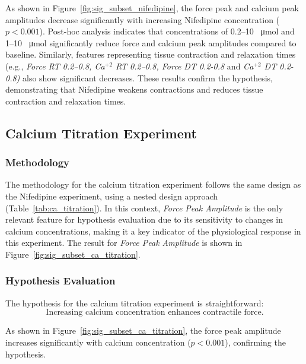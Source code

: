 \documentclass{report}
\begin{document}
            
            As shown in Figure~\ref{fig:sig_subset_nifedipine}, the force peak and calcium peak amplitudes decrease significantly with increasing Nifedipine concentration (\(p < 0.001\)). Post-hoc analysis indicates that concentrations of 0.2–10 \SI{}{\umol} and 1–10 \SI{}{\umol} significantly reduce force and calcium peak amplitudes compared to baseline. Similarly, features representing tissue contraction and relaxation times (e.g., \textit{Force RT 0.2–0.8, Ca$^{+2}$ RT 0.2–0.8, Force DT 0.2-0.8} and \textit{Ca$^{+2}$ DT 0.2-0.8)} also show significant decreases. These results confirm the hypothesis, demonstrating that Nifedipine weakens contractions and reduces tissue contraction and relaxation times.
            
        
   \subsection{Calcium Titration Experiment}
    \label{ca-significance-analysis}
        \subsubsection{Methodology}
           The methodology for the calcium titration experiment follows the same design as the Nifedipine experiment, using a nested design approach (Table~\ref{tab:ca_titration}). In this context, \textit{Force Peak Amplitude} is the only relevant feature for hypothesis evaluation due to its sensitivity to changes in calcium concentrations, making it a key indicator of the physiological response in this experiment. The result for \textit{Force Peak Amplitude} is shown in Figure~\ref{fig:sig_subset_ca_titration}.

            
            \subsubsection{Hypothesis Evaluation}
            The hypothesis for the calcium titration experiment is straightforward:
            \[
            \text{Increasing calcium concentration enhances contractile force.}
            \]
            
            As shown in Figure~\ref{fig:sig_subset_ca_titration}, the force peak amplitude increases significantly with calcium concentration (\(p < 0.001\)), confirming the hypothesis.
    
\end{document}
